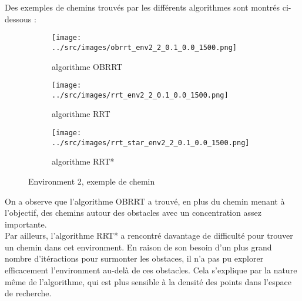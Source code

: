 \documentclass[../CSC_5RO16_TA_TP2.tex]{subfiles}
\begin{document}
\noindent Des exemples de chemins trouvés par les différents algorithmes sont montrés ci-dessous :
\begin{figure}[H]
    \centering
    \begin{subfigure}[b]{0.33\textwidth}
        \centering
        \texttt{[image: ../src/images/obrrt\_env2\_2\_0.1\_0.0\_1500.png]}
        \caption{algorithme \textcolor{graph_green}{OBRRT}}
        \label{}
    \end{subfigure}\hfill
    \begin{subfigure}[b]{0.33\textwidth}
        \centering
        \texttt{[image: ../src/images/rrt\_env2\_2\_0.1\_0.0\_1500.png]}
        \caption{algorithme \textcolor{graph_blue}{RRT}}
        \label{}
    \end{subfigure}\hfill
    \begin{subfigure}[b]{0.33\textwidth}
        \centering
        \texttt{[image: ../src/images/rrt\_star\_env2\_2\_0.1\_0.0\_1500.png]}
        \caption{algorithme \textcolor{graph_orange}{RRT*}}
        \label{}
    \end{subfigure}
    \caption{Environment 2, exemple de chemin}
    \label{}
\end{figure}
\noindent On a observe que l'algorithme \textcolor{graph_green}{OBRRT} a trouvé, en plus du chemin menant à l'objectif, des chemins autour des obstacles avec un concentration assez importante.\\

\noindent Par ailleurs, l'algorithme \textcolor{graph_orange}{RRT*} a rencontré davantage de difficulté pour trouver un chemin dans cet environment. En raison de son besoin d'un plus grand nombre d'itéractions pour surmonter les obstaces, il n'a pas pu explorer efficacement l'environment au-delà de ces obstacles. Cela s'explique par la nature même de l'algorithme, qui est plus sensible à la densité des points dans l'espace de recherche.
\end{document}
